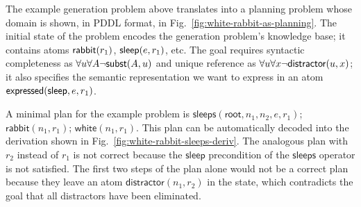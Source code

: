 The example generation problem above translates into a planning
problem whose domain is shown, in PDDL format, in
Fig.~\ref{fig:white-rabbit-as-planning}. The initial state of the
problem encodes the generation problem's knowledge base; it contains
atoms $\mathsf{rabbit}(r_1)$, $\mathsf{sleep}(e,r_1)$, etc.  The goal requires
syntactic completeness as $\forall u \forall A \neg \mathsf{subst}(A,u)$
and unique reference as $\forall u \forall x \neg
\mathsf{distractor}(u,x)$; it also specifies the semantic representation we
want to express in an atom $\mathsf{expressed}(\mathsf{sleep},e,r_1)$.

A minimal plan for the example problem is
$\mathsf{sleeps}(\mathsf{root}, n_1, n_2, e, r_1)$;
$\mathsf{rabbit}(n_1, r_1)$; $\mathsf{white}(n_1, r_1)$. This plan can
be automatically decoded into the derivation shown in
Fig.~\ref{fig:white-rabbit-sleeps-deriv}.  The analogous plan with
$r_2$ instead of $r_1$ is not correct because the $\mathsf{sleep}$
precondition of the $\mathsf{sleeps}$ operator is not satisfied.  The
first two steps of the plan alone would not be a correct plan because
they leave an atom $\mathsf{distractor}(n_1, r_2)$ in the state, which
contradicts the goal that all distractors have been eliminated.






